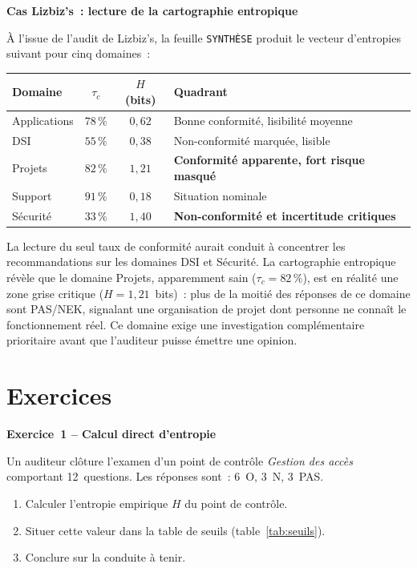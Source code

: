 \begin{boxlizbiz}
\textbf{Cas Lizbiz's~: lecture de la cartographie entropique}

À l'issue de l'audit de Lizbiz's, la feuille \texttt{SYNTHÈSE} produit le
vecteur d'entropies suivant pour cinq domaines~:

\smallskip
\begin{tabular}{lccl}
\toprule
\textbf{Domaine} & $\tau_c$ & $H$ (bits) & \textbf{Quadrant} \\
\midrule
Applications & $78\,\%$ & $0{,}62$ & Bonne conformité, lisibilité moyenne \\
DSI & $55\,\%$ & $0{,}38$ & Non-conformité marquée, lisible \\
Projets & $82\,\%$ & $1{,}21$ & \textbf{Conformité apparente, fort risque masqué} \\
Support & $91\,\%$ & $0{,}18$ & Situation nominale \\
Sécurité & $33\,\%$ & $1{,}40$ & \textbf{Non-conformité et incertitude critiques} \\
\bottomrule
\end{tabular}

\smallskip
La lecture du seul taux de conformité aurait conduit à concentrer les
recommandations sur les domaines DSI et Sécurité. La cartographie entropique
révèle que le domaine Projets, apparemment sain ($\tau_c = 82\,\%$), est en
réalité une zone grise critique ($H = 1{,}21$~bits)~: plus de la moitié des
réponses de ce domaine sont PAS/NEK, signalant une organisation de projet dont
personne ne connaît le fonctionnement réel. Ce domaine exige une investigation
complémentaire prioritaire avant que l'auditeur puisse émettre une opinion.
\end{boxlizbiz}

\section*{Exercices}


\begin{boxexo}
\textbf{Exercice~1 – Calcul direct d'entropie}

Un auditeur clôture l'examen d'un point de contrôle \emph{Gestion des accès}
comportant 12~questions. Les réponses sont~: 6~O, 3~N, 3~PAS.

\begin{enumerate}[label=(\alph*)]
  \item Calculer l'entropie empirique $H$ du point de contrôle.
  \item Situer cette valeur dans la table de seuils (table~\ref{tab:seuils}).
  \item Conclure sur la conduite à tenir.
\end{enumerate}
\end{boxexo}

